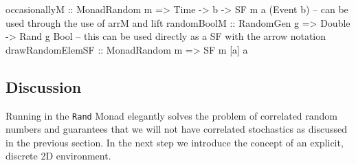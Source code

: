 \begin{HaskellCode}
occasionallyM :: MonadRandom m => Time -> b -> SF m a (Event b)
-- can be used through the use of arrM and lift
randomBoolM :: RandomGen g => Double -> Rand g Bool
-- this can be used directly as a SF with the arrow notation
drawRandomElemSF :: MonadRandom m => SF m [a] a
\end{HaskellCode}

\subsection{Discussion} 
Running in the \texttt{Rand} Monad elegantly solves the problem of correlated random numbers and guarantees that we will not have correlated stochastics as discussed in the previous section. In the next step we introduce the concept of an explicit, discrete 2D environment.